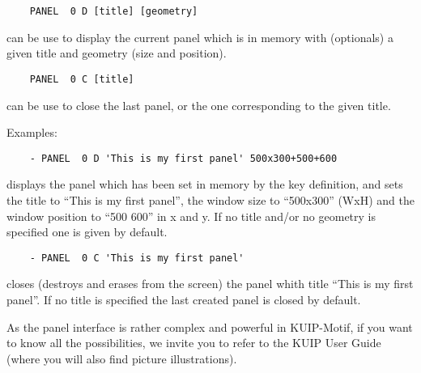 \begin{verbatim}
    PANEL  0 D [title] [geometry]
\end{verbatim}
\ENDVERB
   \par
can be use to display the current panel which is in memory with (optionals) 
   a given title and geometry (size and position).  

\begin{verbatim}
    PANEL  0 C [title]
\end{verbatim}
\ENDVERB
   \par
can be use to close the last panel, or the one corresponding to the given 
   title.  

   \par
Examples:  
\begin{verbatim}
    - PANEL  0 D 'This is my first panel' 500x300+500+600
\end{verbatim}
   \par
displays the panel which has been set in memory by the key definition, and 
   sets the title to ``This is my first panel'', the window size to 
   ``500x300'' (WxH) and the window position to ``500 600'' in x and y.  If no 
   title and/or no geometry is specified one is given by default.  
\begin{verbatim}
    - PANEL  0 C 'This is my first panel'
\end{verbatim}
   \par
closes (destroys and erases from the screen) the panel whith title ``This 
   is my first panel''.  If no title is specified the last created panel is 
   closed by default.  

   \par
As the \DQUOTE{}panel interface\DQUOTE{} is rather complex and powerful in 
   KUIP-Motif, if you want to know all the possibilities, we invite you to 
   refer to the KUIP User Guide (where you will also find picture 
   illustrations).  

\ENDCBIG


\BEGARG
{}
\ENDARG

